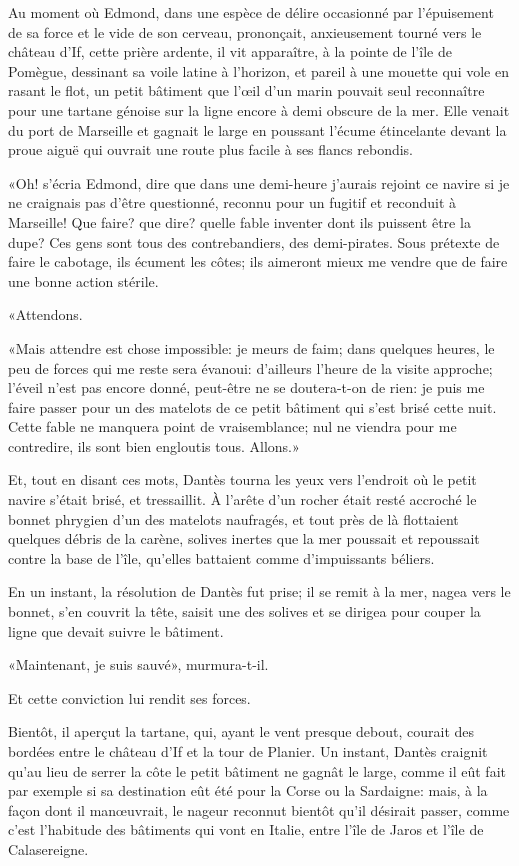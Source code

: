 Au moment où Edmond, dans une espèce de délire occasionné par l'épuisement de sa force et le vide de son cerveau, prononçait, anxieusement tourné vers le château d'If, cette prière ardente, il vit apparaître, à la pointe de l'île de Pomègue, dessinant sa voile latine à l'horizon, et pareil à une mouette qui vole en rasant le flot, un petit bâtiment que l'œil d'un marin pouvait seul reconnaître pour une tartane génoise sur la ligne encore à demi obscure de la mer. Elle venait du port de Marseille et gagnait le large en poussant l'écume étincelante devant la proue aiguë qui ouvrait une route plus facile à ses flancs rebondis.

«Oh! s'écria Edmond, dire que dans une demi-heure j'aurais rejoint ce navire si je ne craignais pas d'être questionné, reconnu pour un fugitif et reconduit à Marseille! Que faire? que dire? quelle fable inventer dont ils puissent être la dupe? Ces gens sont tous des contrebandiers, des demi-pirates. Sous prétexte de faire le cabotage, ils écument les côtes; ils aimeront mieux me vendre que de faire une bonne action stérile.

«Attendons.

«Mais attendre est chose impossible: je meurs de faim; dans quelques heures, le peu de forces qui me reste sera évanoui: d'ailleurs l'heure de la visite approche; l'éveil n'est pas encore donné, peut-être ne se doutera-t-on de rien: je puis me faire passer pour un des matelots de ce petit bâtiment qui s'est brisé cette nuit. Cette fable ne manquera point de vraisemblance; nul ne viendra pour me contredire, ils sont bien engloutis tous. Allons.»

Et, tout en disant ces mots, Dantès tourna les yeux vers l'endroit où le petit navire s'était brisé, et tressaillit. À l'arête d'un rocher était resté accroché le bonnet phrygien d'un des matelots naufragés, et tout près de là flottaient quelques débris de la carène, solives inertes que la mer poussait et repoussait contre la base de l'île, qu'elles battaient comme d'impuissants béliers.

En un instant, la résolution de Dantès fut prise; il se remit à la mer, nagea vers le bonnet, s'en couvrit la tête, saisit une des solives et se dirigea pour couper la ligne que devait suivre le bâtiment.

«Maintenant, je suis sauvé», murmura-t-il.

Et cette conviction lui rendit ses forces.

Bientôt, il aperçut la tartane, qui, ayant le vent presque debout, courait des bordées entre le château d'If et la tour de Planier. Un instant, Dantès craignit qu'au lieu de serrer la côte le petit bâtiment ne gagnât le large, comme il eût fait par exemple si sa destination eût été pour la Corse ou la Sardaigne: mais, à la façon dont il manœuvrait, le nageur reconnut bientôt qu'il désirait passer, comme c'est l'habitude des bâtiments qui vont en Italie, entre l'île de Jaros et l'île de Calasereigne.


